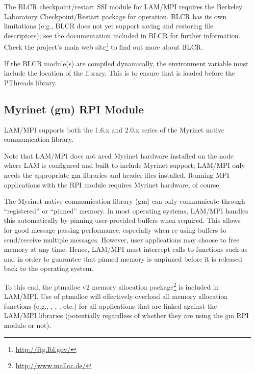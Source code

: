
The BLCR checkpoint/restart SSI module for LAM/MPI requires the
Berkeley Laboratory Checkpoint/Restart package for operation.
%
BLCR has its own limitations (e.g., BLCR does not yet support saving
and restoring file descriptors); see the documentation included in
BLCR for further information.  Check the project's main web
site\footnote{\url{http://ftg.lbl.gov/}} to find out more about BLCR.

If the BLCR module(s) are compiled dynamically, the  
environment variable must include the location of the  library.  
This is to ensure that  is loaded before the PThreads library.


\subsection{Myrinet (gm) RPI Module}
\label{sec:requirements-gm}


LAM/MPI supports both the 1.6.x and 2.0.x series of the Myrinet native
communication library.

Note that LAM/MPI does not need Myrinet hardware installed on the node
where LAM is configured and built to include Myrinet support; LAM/MPI
only needs the appropriate gm libraries and header files installed.
Running MPI applications with the  RPI module requires Myrinet
hardware, of course.  


The Myrinet native communication library (gm) can only communicate
through ``registered'' or ``pinned'' memory.  In most operating
systems, LAM/MPI handles this automatically by pinning user-provided
buffers when required.  This allows for good message passing
performance, especially when re-using buffers to send/receive multiple
messages.  However, user applications may choose to free memory at any
time.  Hence, LAM/MPI must intercept calls to functions such as
 and  in order to guarantee that pinned
memory is unpinned before it is released back to the operating system.

To this end, the ptmalloc v2 memory allocation
package\footnote{\url{http://www.malloc.de/}} is included in LAM/MPI.
Use of ptmalloc will effectively overload all memory allocation
functions (e.g., , , ,
etc.) for all applications that are linked against the LAM/MPI
libraries (potentially regardless of whether they are using the gm RPI
module or not).

